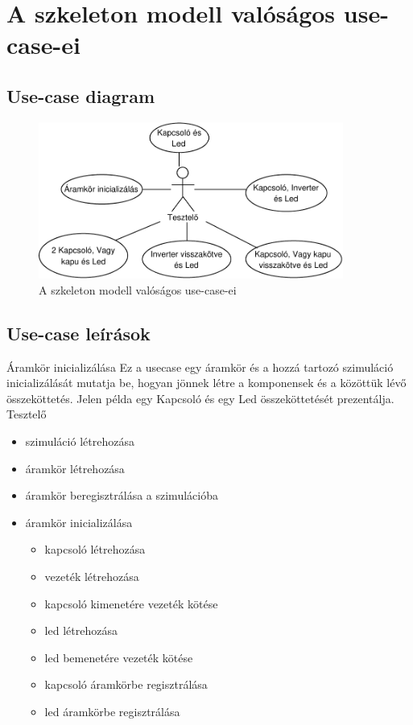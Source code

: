 \section{A szkeleton modell valóságos use-case-ei}

\subsection{Use-case diagram}

\begin{figure}[h]
\begin{center}
\includegraphics[width=10cm]{chapters/chapter05/imgs/usecase.pdf}
\caption{A szkeleton modell valóságos use-case-ei}
\label{fig:SzkeletonUseCase}
\end{center}
\end{figure}

\subsection{Use-case leírások}

\usecase
{Áramkör inicializálása}
{Ez a usecase egy áramkör és a hozzá tartozó szimuláció inicializálását mutatja be, hogyan jönnek létre a komponensek és a közöttük lévő összeköttetés. Jelen példa egy Kapcsoló és egy Led összeköttetését prezentálja.}
{Tesztelő}
{\vspace{-15pt}
\begin{itemize}
\setlength{\itemsep}{0cm}%
\setlength{\parskip}{0cm}%
\item szimuláció létrehozása
\item áramkör létrehozása
\item áramkör beregisztrálása a szimulációba
\item áramkör inicializálása
\begin{itemize}
\setlength{\itemsep}{0cm}%
\setlength{\parskip}{0cm}%
	\item kapcsoló létrehozása
	\item vezeték létrehozása
	\item kapcsoló kimenetére vezeték kötése
	\item led létrehozása
	\item led bemenetére vezeték kötése
	\item kapcsoló áramkörbe regisztrálása
	\item led áramkörbe regisztrálása
\end{itemize}
\end{itemize}
\vspace{-15pt}}

